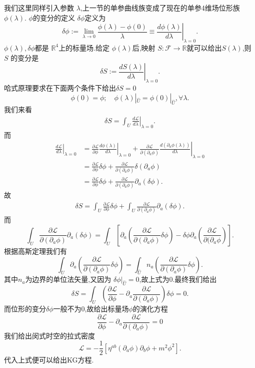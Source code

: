 \documentclass[../main.tex]{subfiles}
\begin{document}
 我们这里同样引入参数 $\lambda$,上一节的单参曲线族变成了现在的单参4维场位形族 $\phi(\lambda)$.
$\phi$的变分的定义 $\delta \phi$定义为 \[
  \delta \phi := \lim_{\lambda\to 0}\frac{\phi(\lambda)- \phi(0)}{\lambda} \equiv \left.\frac{d\phi(\lambda)}{d \lambda}\right|_{\lambda = 0} 
.\] 
$\phi(\lambda),\delta \phi$都是 $\mathbb{R}^4$上的标量场.给定 $\phi(\lambda)$后,映射 $S: \mathscr{F}\to \mathbb{R}$就可以给出$S(\lambda)$,则 $S$
的变分是 \[
\delta S := \left.\frac{d S(\lambda)}{d \lambda}\right|_{\lambda = 0} 
 .\] 
 哈式原理要求在下面两个条件下给出$\delta S =0$\[
 \phi(0) = \phi;\quad \phi(\lambda)|_{\hat{U}} = \phi(0)|_{\hat{U}},\forall\lambda 
 .\] 
 我们来看
 \begin{align*}
 \delta S = \int_{U} \left.\frac{d \mathscr{L}}{d \lambda}\right|_{\lambda = 0} 
 .\end{align*}
 而
 \begin{align*}
 \left.\frac{d \mathscr{L}}{d \lambda}\right|_{\lambda = 0}  &= \frac{\partial \mathscr{L}}{\partial \phi} \left.\frac{d \phi(\lambda)}{d\lambda}\right|_{\lambda=0} + \frac{\partial \mathscr{L}}{\partial (\partial_a \phi)} \left.\frac{d(\partial_a\phi(\lambda))}{d\lambda}\right|_{\lambda = 0}   \\
                                                             & = \frac{\partial \mathscr{L}}{\partial \phi}\delta \phi + \frac{\partial \mathscr{L}}{\partial (\partial_a \phi)}\delta(\partial_a\phi)\\
                                                             & = \frac{\partial \mathscr{L}}{\partial \phi}\delta \phi + \frac{\partial \mathscr{L}}{\partial (\partial_a \phi)}\partial_a(\delta\phi)
 .\end{align*}
 故
 \begin{align*}
\delta S = \int_U \frac{\partial \mathscr{L}}{\partial \phi}\delta \phi + \int_U\frac{\partial \mathscr{L}}{\partial (\partial_a \phi)}\partial_a(\delta\phi)
 .\end{align*}
 而\[
 \int_U\frac{\partial \mathscr{L}}{\partial (\partial_a \phi)}\partial_a(\delta\phi) = \int_U\left[\partial_a\left(\frac{\partial \mathscr{L}}{\partial (\partial_a \phi)}\delta\phi\right) - \delta \phi \partial_a \left( \frac{\partial \mathscr{L}}{\partial (\partial_a\phi}  \right)  \right]
 .\] 
 根据高斯定理我们有\[
 \int_U\partial_a\left(\frac{\partial \mathscr{L}}{\partial (\partial_a \phi)}\delta\phi\right) = \int_{\hat{U}}n_a\left(\frac{\partial \mathscr{L}}{\partial (\partial_a \phi)}\delta\phi\right)
 .\] 
 其中$n_a$为边界的单位法矢量,又因为 $\delta \phi|_{\hat{U}} = 0$,故上式为0.最终我们给出\[
 \delta S = \int_U \left( \frac{\partial \mathscr{L}}{\partial \phi} - \partial_a\frac{\partial \mathscr{L}}{\partial (\partial_a \phi)}   \right) \delta\phi = 0
 .\] 
 而位形的变分$\delta \phi$一般不为0,故给出标量场$\phi$的演化方程 
 \begin{equation}
 \frac{\partial \mathscr{L}}{\partial \phi} - \partial_a\frac{\partial \mathscr{L}}{\partial (\partial_a \phi)} = 0
 \label{eq:15-1-3}
 \end{equation}
 我们给出闵式时空的拉式密度\[
 \mathscr{L} = - \frac{1}{2}[\eta^{ab}(\partial_a\phi)\partial_b\phi +m^2\phi^2]
 .\] 
 代入上式便可以给出KG方程.
\end{document}
